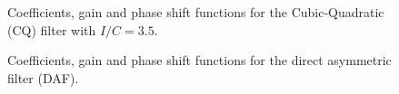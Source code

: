 \documentclass[
]{article}
\newcommand\1{\mathds{1}}
\begin{document}
\begin{figure}

\caption{\label{fig-graphs-coef-cq}Coefficients, gain and phase shift
functions for the Cubic-Quadratic (CQ) filter with \(I/C=3.5\).}


\end{figure}%

\begin{figure}

\caption{\label{fig-graphs-coef-daf}Coefficients, gain and phase shift
functions for the direct asymmetric filter (DAF).}


\end{figure}%

\newpage
\end{document}
